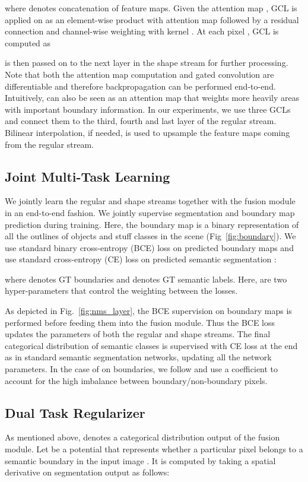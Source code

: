 \documentclass[10pt,twocolumn,letterpaper]{article}
\begin{document}
where  denotes concatenation of feature maps.
Given the attention map , GCL is applied on  as an element-wise product  with attention map  followed by a residual connection and channel-wise weighting with kernel . At each pixel , GCL  is computed as
\vspace{-2mm}

 is then passed on to the next layer in the shape stream for further processing.
Note that both the attention map computation and gated convolution are differentiable and therefore backpropagation can be performed end-to-end. 
Intuitively,  can also be seen as an attention map that weights more heavily areas with important boundary information. 
In our experiments, we  use three GCLs and connect them to the third, fourth and last layer of the regular stream. Bilinear interpolation, if needed,  is used to upsample the feature maps coming from the regular stream.


\subsection{Joint Multi-Task Learning}
We jointly learn the regular and shape streams together with the fusion module in an end-to-end fashion. 
We jointly supervise segmentation and boundary map prediction during training. 
Here, the boundary map is a binary representation of all the outlines of objects and stuff classes in the scene (Fig~\ref{fig:boundary}). 
We use standard binary cross-entropy (BCE) loss on predicted boundary maps  and use standard cross-entropy (CE) loss on predicted semantic segmentation :

where  denotes GT boundaries and  denotes GT semantic labels.
Here,  are two hyper-parameters that control the weighting between the losses.

As depicted in Fig.~\ref{fig:nms_layer}, the BCE supervision on boundary maps  is performed before feeding them into the fusion module. Thus the BCE loss  updates the parameters of both the regular and shape streams.
The final categorical distribution  of semantic classes is supervised with CE loss  at the end as in standard semantic segmentation networks, updating all the network parameters.
In the case of  on boundaries, we follow \cite{xie2015hed,yu2017casenet} and use a coefficient  to account for the high imbalance between boundary/non-boundary pixels. 

\subsection{Dual Task Regularizer} 
As mentioned above,  denotes a categorical distribution output of the fusion module.
Let  be a potential that represents whether a particular pixel belongs to a semantic boundary in the input image . It is computed by taking a spatial derivative on segmentation output as follows:
\end{document}
